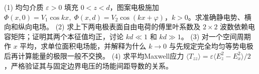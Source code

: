 (1) 均匀介质 \(\varepsilon>0\) 填充 \(0<z<d\)，图案电极施加
\(\Phi(x,0)=V_1\cos kx,\;\Phi(x,d)=V_2\cos(kx+\varphi)\)，\(k>0\)。求准确静电势、横向和纵向电场。
(2) 求上下两电极表面自由电荷的傅里叶系数及 \(2\times2\) 波数依赖电容矩阵；证明其两个本征值均正，讨论 \(kd\ll1\) 和 \(kd\gg1\)。
(3) 对一个空间周期作 \(x\) 平均，求单位面积电场能，并解释为什么 \(k\to0\) 与先规定完全均匀等势电极后再计算能量的极限一般不交换。
(4) 求平均Maxwell应力 \(\langle T_{zz}\rangle=\varepsilon\langle E_z^2-E_x^2\rangle/2\)，严格验证其与固定边界电压的场能间距导数的关系。
